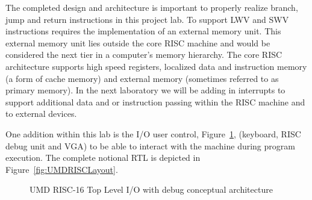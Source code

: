 \documentclass{article}
\begin{document}
The completed design and architecture is important to properly realize branch, jump and return instructions in this project lab. To support LWV and SWV instructions requires the implementation of an external memory unit. This external memory unit lies outside the core RISC machine and would be considered the next tier in a computer’s memory hierarchy. The core RISC architecture supports high speed registers, localized data and instruction memory (a form of cache memory) and external memory (sometimes referred to as primary memory). In the next laboratory we will be adding in interrupts to support additional data and or instruction passing within the RISC machine and to external devices.

One addition within this lab is the I/O user control, Figure~\ref{fig:RiscToplevel}, (keyboard, RISC debug unit and VGA) to be able to interact with the machine during program execution. The complete notional RTL is depicted in Figure~\ref{fig:UMDRISCLayout}.

\begin{figure}[!htbp]
  \centering
  \caption{UMD RISC-16 Top Level I/O with debug conceptual architecture}
  \label{fig:RiscToplevel}
\end{figure}
\FloatBarrier
\end{document}
